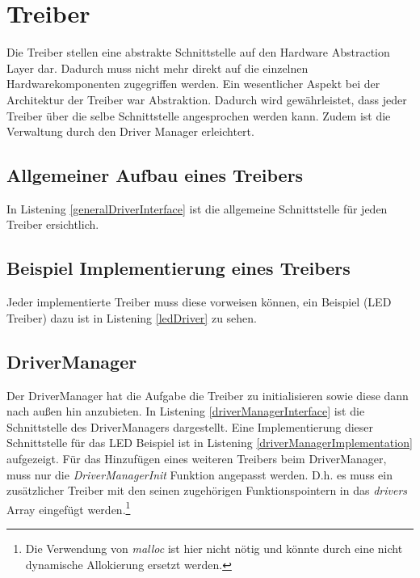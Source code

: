 \section{Treiber}
\label{chapDriver}
Die Treiber stellen eine abstrakte Schnittstelle auf den Hardware Abstraction Layer dar. Dadurch muss nicht mehr direkt auf die einzelnen Hardwarekomponenten zugegriffen werden. Ein wesentlicher Aspekt bei der Architektur der Treiber war Abstraktion. Dadurch wird gewährleistet, dass jeder Treiber über die selbe Schnittstelle angesprochen werden kann. Zudem ist die Verwaltung durch den Driver Manager erleichtert.

\subsection{Allgemeiner Aufbau eines Treibers}
In Listening \ref{generalDriverInterface} ist die allgemeine Schnittstelle für jeden Treiber ersichtlich. 



\subsection{Beispiel Implementierung eines Treibers}
Jeder implementierte Treiber muss diese vorweisen können, ein Beispiel (LED Treiber) dazu ist in Listening \ref{ledDriver} zu sehen.



\subsection{DriverManager}
\label{secDriverManager}
Der DriverManager hat die Aufgabe die Treiber zu initialisieren sowie diese dann nach außen hin anzubieten. In Listening \ref{driverManagerInterface} ist die Schnittstelle des DriverManagers dargestellt. Eine Implementierung dieser Schnittstelle für das LED Beispiel ist in Listening \ref{driverManagerImplementation} aufgezeigt. Für das Hinzufügen eines weiteren Treibers beim DriverManager, muss nur die \textit{DriverManagerInit} Funktion angepasst werden. D.h. es muss ein zusätzlicher Treiber mit den seinen zugehörigen Funktionspointern in das \textit{drivers} Array eingefügt werden.\footnote{Die Verwendung von \textit{malloc} ist hier nicht nötig und könnte durch eine nicht dynamische Allokierung ersetzt werden.}





\pagebreak 